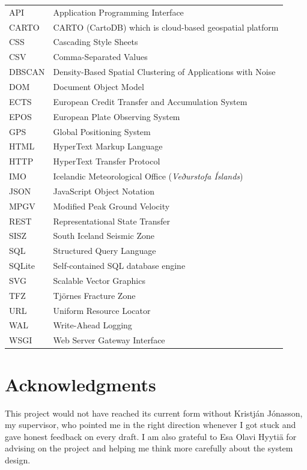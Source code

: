 \documentclass[12pt]{article}
\begin{document}
\begin{tabular}{@{}ll}
API   & Application Programming Interface \\
CARTO & CARTO (CartoDB) which is cloud-based geospatial platform \\
CSS   & Cascading Style Sheets \\
CSV   & Comma-Separated Values \\
DBSCAN & Density-Based Spatial Clustering of Applications with Noise \\
DOM   & Document Object Model \\
ECTS  & European Credit Transfer and Accumulation System \\
EPOS  & European Plate Observing System \\
GPS   & Global Positioning System \\
HTML  & HyperText Markup Language \\
HTTP  & HyperText Transfer Protocol \\
IMO   & Icelandic Meteorological Office (\textit{Veðurstofa Íslands}) \\
JSON  & JavaScript Object Notation \\
MPGV  & Modified Peak Ground Velocity \\
REST  & Representational State Transfer \\
SISZ  & South Iceland Seismic Zone \\
SQL   & Structured Query Language \\
SQLite & Self-contained SQL database engine \\
SVG   & Scalable Vector Graphics \\
TFZ   & Tjörnes Fracture Zone \\
URL   & Uniform Resource Locator \\
WAL   & Write-Ahead Logging \\
WSGI  & Web Server Gateway Interface \\
\end{tabular}

\clearpage
\null
\thispagestyle{empty}
\newpage

\section*{Acknowledgments}

This project would not have reached its current form without Kristján Jónasson, my supervisor, who pointed me in the right direction whenever I got stuck and gave honest feedback on every draft. I am also grateful to Esa Olavi Hyytiä for advising on the project and helping me think more carefully about the system design.
\end{document}

